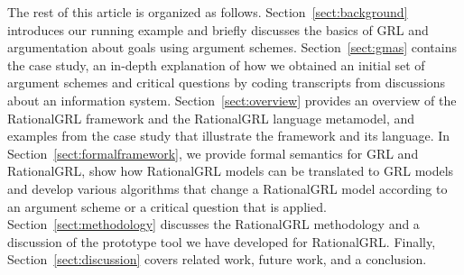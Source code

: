 The rest of this article is organized as follows. Section~\ref{sect:background} introduces our running example and briefly discusses the basics of GRL and argumentation about goals using argument schemes. Section~\ref{sect:gmas} contains the case study, an in-depth explanation of how we obtained an initial set of argument schemes and critical questions by coding transcripts from discussions about an information system. Section~\ref{sect:overview} provides an overview of the RationalGRL framework and the RationalGRL language metamodel, and examples from the case study that illustrate the framework and its language. In Section~\ref{sect:formalframework}, we provide formal semantics for GRL and RationalGRL, show how RationalGRL models can be translated to GRL models and develop various algorithms that change a RationalGRL model according to an argument scheme or a critical question that is applied. Section~\ref{sect:methodology} discusses the RationalGRL methodology and a discussion of the prototype tool we have developed for RationalGRL. Finally, Section~\ref{sect:discussion} covers related work, future work, and a conclusion.